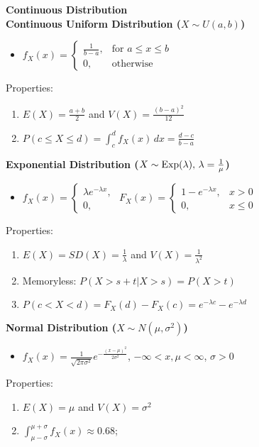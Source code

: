 \documentclass[a4paper, 12pt]{article}
\begin{document}
\begin{multicols*}{4}
\medskip

{\small\textbf{Continuous Distribution}} \\
\textbf{Continuous Uniform Distribution ($X \sim U(a,b)$)}
\begin{itemize}
    \item $f_X(x) = 
        \begin{cases}
            \frac{1}{b-a}, & \text{for } a \leq x \leq b \\
            0, & \text{otherwise}
        \end{cases}$
\end{itemize}
Properties:
\begin{enumerate}
    \item $E(X) = \frac{a+b}{2}$ and $V(X) = \frac{(b-a)^2}{12}$
    \item $P(c \leq X \leq d) = \int_c^d f_X(x) \, dx = \frac{d-c}{b-a}$
\end{enumerate}
\textbf{Exponential Distribution ($X \sim \textnormal{Exp}(\lambda), \, \lambda=\frac{1}{\mu}$)}
\begin{itemize}
    \item $f_X(x) =
    \begin{cases}
        \lambda e^{-\lambda x}, \\
        0,
    \end{cases}$
$F_X(x) =
    \begin{cases}
        1 - e^{-\lambda x}, & x > 0 \\
        0, & x \leq 0
    \end{cases}$
\end{itemize}
Properties:
\begin{enumerate}
    \item $E(X) = SD(X) = \frac{1}{\lambda}$ and $V(X) = \frac{1}{\lambda^2}$
    \item Memoryless: $P(X>s+t|X>s)=P(X>t)$
    \item $P(c<X<d) = F_X(d) - F_X(c) = e^{-\lambda c} - e^{-\lambda d}$
\end{enumerate}
\textbf{Normal Distribution ($X \sim N(\mu,\sigma^2)$)}
\begin{itemize}
    \item $f_X(x) = \frac{1}{\sqrt{2\pi \sigma^2}}e^{-\frac{(x-\mu)^2}{2\sigma^2}}$, $-\infty<x,\mu<\infty$, $\sigma>0$
\end{itemize}
Properties:
\begin{enumerate}
    \item $E(X) = \mu$ and $V(X) = \sigma^2$
    \item $\int_{\mu-\sigma}^{\mu+\sigma}f_X(x) \approx 0.68$; 

\end{enumerate}
\end{multicols*}
\end{document}
